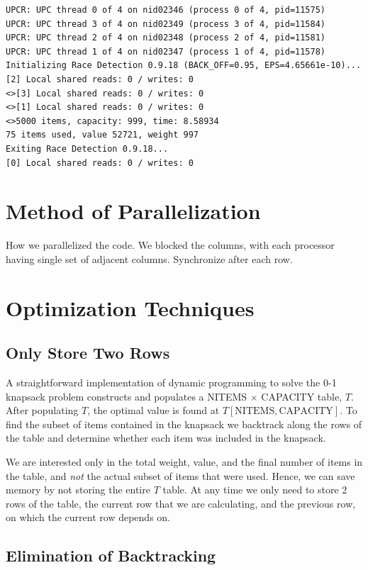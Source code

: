 \documentclass[11pt]{article} %
\begin{document}
{\tiny
\begin{lstlisting}
UPCR: UPC thread 0 of 4 on nid02346 (process 0 of 4, pid=11575)
UPCR: UPC thread 3 of 4 on nid02349 (process 3 of 4, pid=11584)
UPCR: UPC thread 2 of 4 on nid02348 (process 2 of 4, pid=11581)
UPCR: UPC thread 1 of 4 on nid02347 (process 1 of 4, pid=11578)
Initializing Race Detection 0.9.18 (BACK_OFF=0.95, EPS=4.65661e-10)...
[2] Local shared reads: 0 / writes: 0
<>[3] Local shared reads: 0 / writes: 0
<>[1] Local shared reads: 0 / writes: 0
<>5000 items, capacity: 999, time: 8.58934
75 items used, value 52721, weight 997
Exiting Race Detection 0.9.18...
[0] Local shared reads: 0 / writes: 0
\end{lstlisting}
}

\section{Method of Parallelization}

How we parallelized the code. We blocked the columns, with each processor having single set of adjacent columns. Synchronize after each row.

\section{Optimization Techniques}

\subsection{Only Store Two Rows}
A straightforward implementation of dynamic programming to solve the 0-1 knapsack problem constructs and populates a NITEMS $\times$ CAPACITY table, $T$. After populating $T$, the optimal value is found at $T[\text{NITEMS}, \text{CAPACITY}]$. To find the subset of items contained in the knapsack we backtrack along the rows of the table and determine whether each item was included in the knapsack. 

We are interested only in the total weight, value, and the final number of items in the table, and \emph{not} the actual subset of items that were used. Hence, we can save memory by not storing the entire $T$ table. At any time we only need to store 2 rows of the table, the current row that we are calculating, and the previous row, on which the current row depends on.

\subsection{Elimination of Backtracking}
\end{document}
